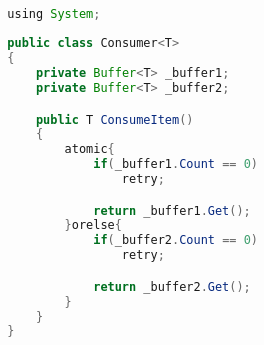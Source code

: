 \begin{lstlisting}[label=lst:stm_atomic_syntax_orelse,
  caption={OrElse Syntax},
  language=Java,  
  showspaces=false,
  showtabs=false,
  breaklines=true,
  showstringspaces=false,
  breakatwhitespace=true,
  commentstyle=\color{greencomments},
  keywordstyle=\color{bluekeywords},
  stringstyle=\color{redstrings},
  morekeywords={atomic, retry, orelse, var, get, set, using}]  % Start your code-block

  using System;
  
  public class Consumer<T>
  {
      private Buffer<T> _buffer1;
      private Buffer<T> _buffer2;

      public T ConsumeItem()
      {
          atomic{
              if(_buffer1.Count == 0)
                  retry;

              return _buffer1.Get();
          }orelse{
              if(_buffer2.Count == 0)
                  retry;

              return _buffer2.Get();
          }
      }
  }
\end{lstlisting}



%
%
%
%    
%
%    
         
         

\worksheetend
